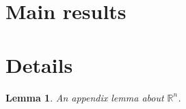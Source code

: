 \documentclass{amsart}
\newtheorem{lemma}[theorem]{Lemma}
\newcommand{\R}{\mathbb{R}}
\begin{document}
\maketitle

\section{Main results}\label{sec:main}

\appendix
\section{Details}
\begin{lemma}\label{lem:app}
An appendix lemma about $\R^n$.
\end{lemma}
\end{document}
